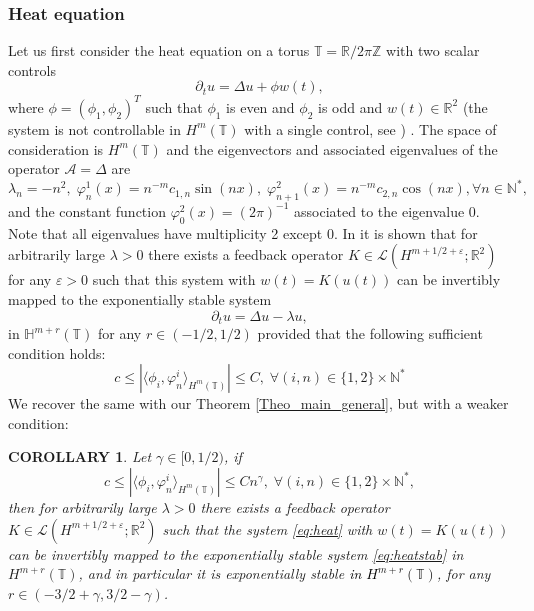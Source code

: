 \documentclass[11pt, dvipsnames]{amsart}
\newtheorem{corollary}[theorem]{COROLLARY}
\begin{document}
\subsubsection{Heat equation}\label{sec:diff1}
Let us first consider the heat equation on a torus $\mathbb{T} = \mathbb{R}/2\pi\mathbb{Z}$ with two scalar controls
\begin{equation}
\label{eq:heat}
    \partial_{t} u = \Delta u + \phi w(t),
\end{equation}
where $\phi = (\phi_{1},\phi_{2})^{T}$ such that $\phi_1$ is even and $\phi_{2}$ is odd and $w(t)\in\mathbb{R}^{2}$ (the system is not controllable in $H^{m}(\mathbb{T})$ with a single control, see \cite{Gagnon2022-fredholm-laplacien}) . The space of consideration is $H^{m}(\mathbb{T})$ and the eigenvectors and associated eigenvalues of the operator $\mathcal{A} = \Delta$ are
\begin{equation}\label{phi-n-i-heat}
    \lambda_{n} = -n^{2},\;\varphi_{n}^{1}(x) = n^{-m}c_{1,n}\sin(n x),\;\varphi_{n+1}^{2}(x) = n^{-m}c_{2,n}\cos(n x), \forall n\in\mathbb{N}^{*},
\end{equation}
and the constant function $\varphi_{0}^{2}(x) = (2\pi)^{-1}$ associated to the eigenvalue $0$. Note that all eigenvalues have multiplicity 2 except $0$. In \cite{Gagnon2022-fredholm-laplacien} it is shown that for arbitrarily large $\lambda>0$ there exists a feedback operator $K\in \mathcal{L}(H^{m+1/2+\varepsilon};\mathbb{R}^{2})$ for any $\varepsilon>0$ such that this system with $w(t)=K(u(t))$ can be invertibly mapped to the exponentially stable system 
\begin{equation}
\label{eq:heatstab}
    \partial_{t}u = \Delta u-\lambda u,
\end{equation}
in $\mathbb{H}^{m+r}(\mathbb{T})$ for any $r\in(-1/2,1/2)$ provided that the following sufficient condition holds:
\begin{equation}
    c \leq |\langle \phi_{i},\varphi_{n}^{i}\rangle_{H^{m}(\mathbb{T})}|\leq C,\;\forall (i,n)\in \{1,2\}\times\mathbb{N}^{*}
\end{equation}
We recover the same with our Theorem \ref{Theo_main_general}, but with a weaker condition:
\begin{corollary}
\label{cor:heat}
    Let $\gamma\in[0,1/2)$, if
    \begin{equation}
    c \leq |\langle \phi_{i},\varphi_{n}^{i}\rangle_{H^{m}(\mathbb{T})}|\leq C n^{\gamma},\;\forall (i,n)\in \{1,2\}\times\mathbb{N}^{*},
    \end{equation}
    then for arbitrarily large $\lambda>0$ there exists a feedback operator $K\in \mathcal{L}(H^{m+1/2+\varepsilon};\mathbb{R}^{2})$ such that the system \textcolor{black}{\eqref{eq:heat}} with $w(t)=K(u(t))$ can be invertibly mapped to the exponentially stable system \eqref{eq:heatstab} in $H^{m+r}(\mathbb{T})$, and in particular it is exponentially stable \textcolor{black}{in $H^{m+r}(\mathbb{T})$}, for any $r\in(-3/2+\gamma,3/2-\gamma)$.
\end{corollary}
\end{document}
